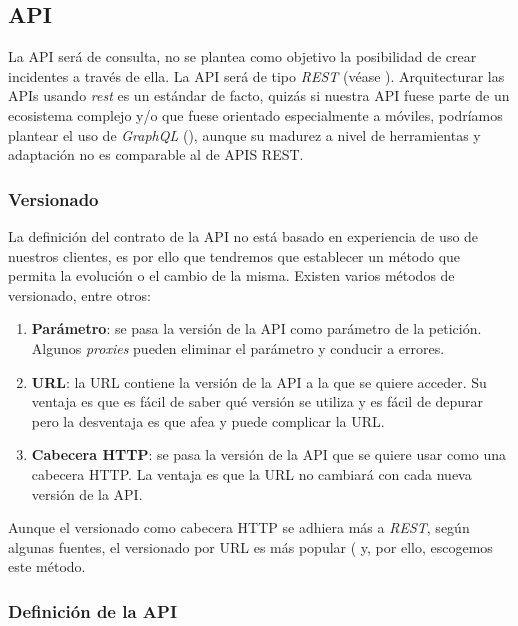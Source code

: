 \subsection{API}

La API será de consulta, no se plantea como objetivo la posibilidad de crear incidentes a través de ella. La API será
de tipo \emph{REST} (véase \cite{rest}). Arquitecturar las APIs usando \emph{rest} es un estándar de facto, quizás si nuestra API fuese parte de
un ecosistema complejo y/o que fuese orientado especialmente a móviles, podríamos plantear el uso de \emph{GraphQL} (\cite{graphql}), aunque su madurez
a nivel de herramientas y adaptación no es comparable al de APIS REST.

\subsubsection{Versionado}

La definición del contrato de la API no está basado en experiencia de uso de nuestros clientes, es por ello que tendremos que establecer 
un método que permita la evolución o el cambio de la misma. Existen varios métodos de versionado, entre otros:

\begin{enumerate}
    \item \textbf{Parámetro}: se pasa la versión de la API como parámetro de la petición. Algunos \emph{proxies} pueden eliminar el parámetro y conducir a errores.
    \item \textbf{URL}: la URL contiene la versión de la API a la que se quiere acceder. Su ventaja es que es fácil de saber qué versión se utiliza y es fácil de depurar pero la desventaja es que afea y puede complicar la
    URL.
    \item \textbf{Cabecera HTTP}: se pasa la versión de la API que se quiere usar como una cabecera HTTP. La ventaja es que la URL no cambiará con 
    cada nueva versión de la API. 
\end{enumerate}

Aunque el versionado como cabecera HTTP se adhiera más a \emph{REST}, según algunas fuentes, el versionado por URL es más popular (\cite{3scale-versionado)} y, por ello, escogemos este método.

\subsubsection{Definición de la API}
\label{subsubsec:definicion-api}

